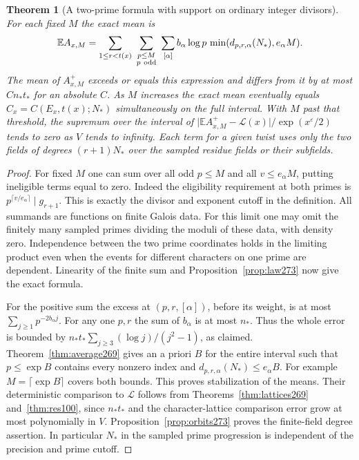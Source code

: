 \documentclass[a4paper,11pt]{article}
\newtheorem{theorem}[proposition]{Theorem}
\theoremstyle{definition}
\theoremstyle{remark}
\numberwithin{equation}{section}
\begin{document}
\begin{theorem}[A two-prime formula with support on ordinary integer divisors]\leavevmode
\label{thm:mean273}
For each fixed \(M\) the exact mean is
\[
       \mathbb E A_{x,M}=
       \sum_{1\le r<t(x)}\ \sum_{\substack{p\le M\\p\ {\rm odd}}}
       \ \sum_{[\alpha]} b_\alpha\log p\,\min(d_{p,r,\alpha}(N_*),
                                             e_\alpha M).
\]
The mean of \(A^+_{x,M}\) exceeds or equals this expression and
differs from it by at most \(C n_*t_*\) for an absolute \(C\).
As \(M\) increases the exact mean eventually equals
\(C_x=C(E_x,t(x);N_*)\) simultaneously on the full interval.
With \(M\) past that threshold, the supremum over the interval of
\(\big|\mathbb E A^+_{x,M}-\mathcal L(x)\big|/\exp(x^\varepsilon/2)\)
tends to zero as \(V\) tends to infinity. Each term for a given
twist uses only the two fields of degrees \((r+1)N_*\) over the
sampled residue fields or their subfields.
\end{theorem}
\begin{proof}
For fixed \(M\) one can sum over all odd \(p\le M\) and all
\(v\le e_\alpha M\), putting ineligible terms equal to zero.
Indeed the eligibility requirement at both primes is
\(p^{\lceil v/e_\alpha\rceil}\mid g_{r+1}\). This is exactly
the divisor and exponent cutoff in the definition. All
summands are functions on finite Galois data. For this limit
one may omit the finitely many sampled primes dividing the
moduli of these data, with density zero. Independence between
the two prime coordinates holds in the limiting product even
when the events for different characters on one prime are
dependent. Linearity of the finite sum and
Proposition~\ref{prop:law273} now give the exact formula.

For the positive sum the excess at \((p,r,[\alpha])\),
before its weight, is at most \(\sum_{j\ge1}p^{-2b_\alpha j}\).
For any one \(p,r\) the sum of \(b_\alpha\) is at most \(n_*\).
Thus the whole error is bounded by
\(n_*t_*\sum_{j\ge3}(\log j)/(j^2-1)\), as claimed.
Theorem~\ref{thm:average269} gives an a priori \(B\) for the
entire interval such that \(p\le\exp B\) contains every nonzero
index and \(d_{p,r,\alpha}(N_*)\le e_\alpha B\).
For example \(M=\lceil\exp B\rceil\) covers both bounds.
This proves stabilization of the means. Their deterministic
comparison to \(\mathcal L\) follows from
Theorems~\ref{thm:lattices269} and~\ref{thm:res100}, since
\(n_*t_*\) and the character-lattice comparison error grow
at most polynomially in \(V\).
Proposition~\ref{prop:orbits273} proves the finite-field
degree assertion. In particular \(N_*\) in the sampled prime
progression is independent of the precision and prime cutoff.
\end{proof}
\end{document}
